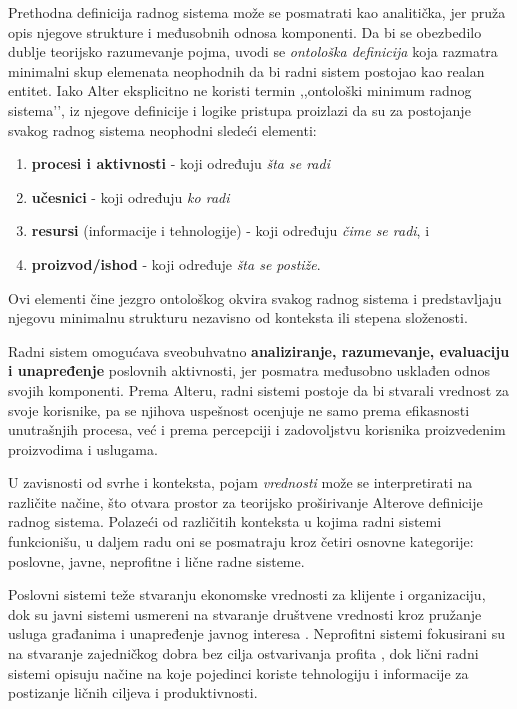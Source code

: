 Prethodna definicija radnog sistema može se posmatrati kao analitička, jer pruža opis njegove strukture i međusobnih odnosa komponenti. Da bi se obezbedilo dublje teorijsko razumevanje pojma, uvodi se \textit{ontološka definicija} koja razmatra minimalni skup elemenata neophodnih da bi radni sistem postojao kao realan entitet. Iako Alter eksplicitno ne koristi termin ,,ontološki minimum radnog sistema’’, iz njegove definicije i logike pristupa proizlazi da su za postojanje svakog radnog sistema neophodni sledeći elementi:
\begin{enumerate}
\item \textbf{procesi i aktivnosti} - koji određuju \textit{šta se radi}
\item \textbf{učesnici} - koji određuju \textit{ko radi}
\item \textbf{resursi} (informacije i tehnologije) - koji određuju \textit{čime se radi}, i
\item \textbf{proizvod/ishod} - koji određuje \textit{šta se postiže}.
\end{enumerate}
Ovi elementi čine jezgro ontološkog okvira svakog radnog sistema i predstavljaju njegovu minimalnu strukturu nezavisno od konteksta ili stepena složenosti.

Radni sistem omogućava sveobuhvatno \textbf{analiziranje, razumevanje, evaluaciju i unapređenje} poslovnih aktivnosti, jer posmatra međusobno usklađen odnos svojih komponenti. Prema Alteru, radni sistemi postoje da bi stvarali vrednost za svoje korisnike, pa se njihova uspešnost ocenjuje ne samo prema efikasnosti unutrašnjih procesa, već i prema percepciji i zadovoljstvu korisnika proizvedenim proizvodima i uslugama.

U zavisnosti od svrhe i konteksta, pojam \textit{vrednosti} može se interpretirati na različite načine, što otvara prostor za teorijsko proširivanje Alterove definicije radnog sistema. Polazeći od različitih konteksta u kojima radni sistemi funkcionišu, u daljem radu oni se posmatraju kroz četiri osnovne kategorije: poslovne, javne, neprofitne i lične radne sisteme.

Poslovni sistemi teže stvaranju ekonomske vrednosti za klijente i organizaciju, dok su javni sistemi usmereni na stvaranje društvene vrednosti kroz pružanje usluga građanima i unapređenje javnog interesa \cite{moore1997creating}. Neprofitni sistemi fokusirani su na stvaranje zajedničkog dobra bez cilja ostvarivanja profita \cite{murray1994evaluating}, dok lični radni sistemi opisuju načine na koje pojedinci koriste tehnologiju i informacije za postizanje ličnih ciljeva i produktivnosti.

